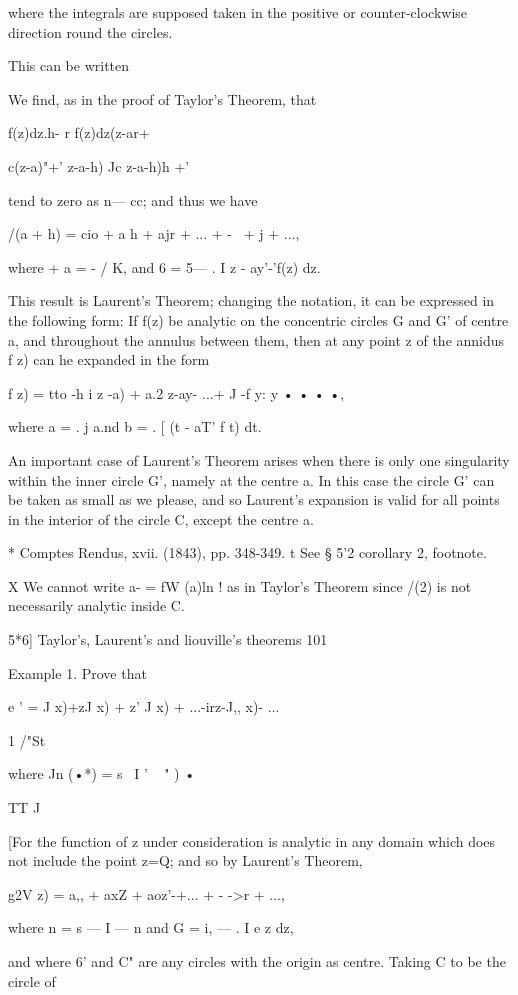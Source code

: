 {{where the integrals are supposed taken in the positive or
counter-clockwise direction round the circles.

This can be written

We find, as in the proof of Taylor's Theorem, that

f(z)dz.h- r f(z)dz(z-ar+

c(z-a)"+' z-a-h) Jc z-a-h)h +'

tend to zero as n— cc; and thus we have

/(a + h) = cio + a h + ajr + ... + -~ + j + ...,

where + a = - / K, and 6 = 5— . I z - ay'-'f(z) dz.

This result is Laurent's Theorem; changing the notation, it can be
expressed in the following form: If f(z) be analytic on the concentric
circles G and G' of centre a, and throughout the annulus between them,
then at any point z of the annidus f z) can he expanded in the form

f z) = tto -h i z -a) + a.2 z-ay- ...+ J -f y: y • • • •,

where a = . j a.nd b = . [ (t - aT' f t) dt.

An important case of Laurent's Theorem arises when there is only one
singularity within the inner circle G', namely at the centre a. In
this case the circle G' can be taken as small as we please, and so
Laurent's expansion is valid for all points in the interior of the
circle C, except the centre a.

* Comptes Rendus, xvii. (1843), pp. 348-349. t See § 5'2 corollary 2,
footnote.

X We cannot write a- = fW (a)ln ! as in Taylor's Theorem since /(2) is
not necessarily analytic inside C.

5*6] Taylor's, Laurent's and liouville's theorems 101

Example 1. Prove that

e ' = J x)+zJ x) + z' J x) + ...-irz-J,, x)- ...

1 /"St

where Jn (•*) = s~ I ' ~ " ) •

 TT J

[For the function of z under consideration is analytic in any domain
which does not include the point z=Q; and so by Laurent's Theorem,

g2V z) = a,, + axZ + aoz'-+... + - ->r + ...,

where n = s — I — n and G = i, — . I e z dz,

and where 6' and C" are any circles with the origin as centre. Taking
C to be the circle of

}}
